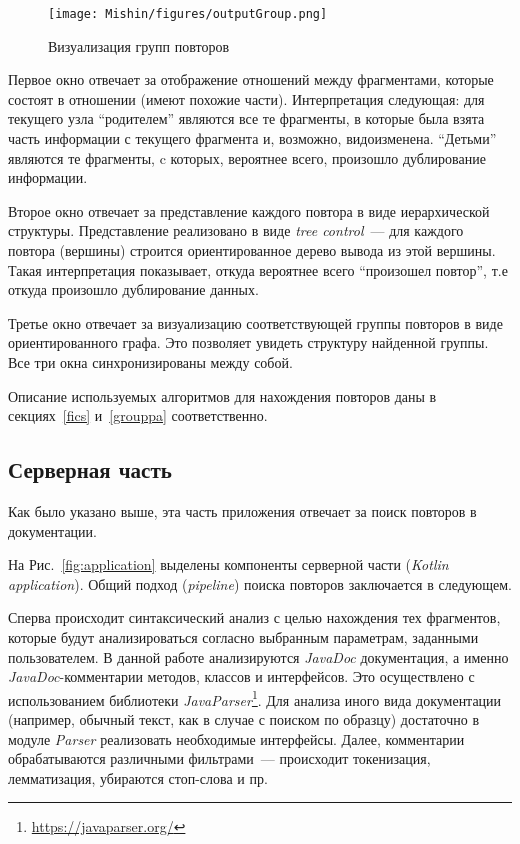 \begin{figure}[h!]
    \centering
    \texttt{[image: Mishin/figures/outputGroup.png]}
    \caption{Визуализация групп повторов}\label{fig:groupViz}
\end{figure}


Первое окно отвечает за отображение отношений между фрагментами, которые состоят в отношении (имеют похожие части).
Интерпретация следующая: для текущего узла ``родителем'' являются все те фрагменты, в которые была взята часть информации с текущего фрагмента и, возможно, видоизменена.
``Детьми'' являются те фрагменты, c которых, вероятнее всего, произошло дублирование информации.

Второе окно отвечает за представление каждого повтора в виде иерархической структуры.
Представление реализовано в виде \emph{tree control}~--- для каждого повтора (вершины) строится ориентированное дерево вывода из этой вершины.
Такая интерпретация показывает, откуда вероятнее всего ``произошел повтор'', т.е откуда произошло дублирование данных.

Третье окно отвечает за визуализацию соответствующей группы повторов в  виде ориентированного графа.
Это позволяет увидеть структуру найденной группы. Все три окна синхронизированы между собой.

Описание используемых алгоритмов для нахождения повторов даны в секциях~\ref{fics} и~\ref{grouppa}  соответственно.    



\subsection{Серверная часть}\label{server}
Как было указано выше, эта часть приложения отвечает за поиск повторов в документации.

На Рис.~\ref{fig:application} выделены компоненты серверной части (\emph{Kotlin application}).
Общий подход (\emph{pipeline}) поиска повторов заключается в следующем.

Сперва происходит синтаксический анализ с целью нахождения тех фрагментов, которые будут анализироваться согласно выбранным параметрам, заданными пользователем.
В данной работе анализируются \emph{JavaDoc} документация, а именно \emph{JavaDoc}-комментарии методов, классов и интерфейсов.
Это осуществлено с использованием библиотеки \emph{JavaParser}\footnote{\url{https://javaparser.org/}}.
Для анализа иного вида документации (например, обычный текст, как в случае с поиском по образцу) достаточно в модуле \emph{Parser} реализовать необходимые интерфейсы.
Далее, комментарии обрабатываются различными фильтрами~--- происходит токенизация, лемматизация, убираются стоп-слова и пр.


